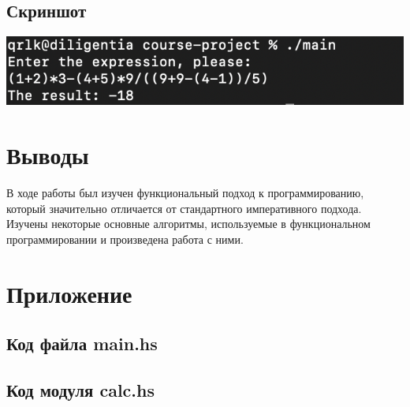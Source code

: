\documentclass[a4paper,11pt]{article}
\begin{document}
  \subsection{Скриншот}
    \includegraphics[scale=1.0]{img.png}

\section{Выводы}
  В ходе работы был изучен функциональный подход к программированию, который значительно отличается от стандартного императивного подхода.
  Изучены некоторые основные алгоритмы, используемые в функциональном программировании и произведена работа с ними.
  \newpage

\section{Приложение}
  \subsection{Код файла main.hs}
    
  \subsection{Код модуля calc.hs}
    
\end{document}
